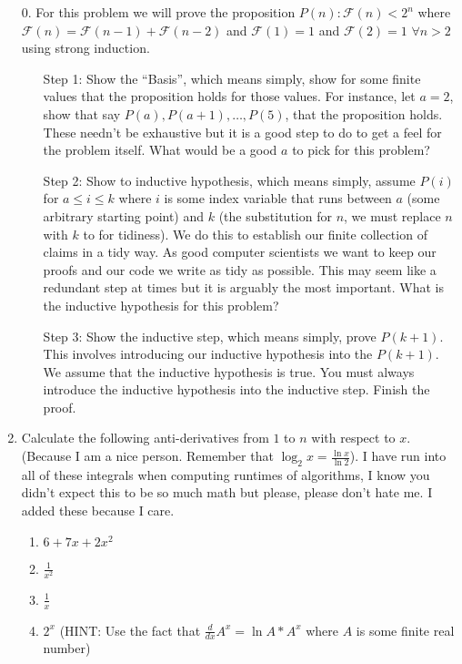 \documentclass[12pt]{article}
\begin{document}
\begin{enumerate}
\item[0.] For this problem we will prove the proposition $P(n):\mathscr{F}(n) < 2^n$ where 
$\mathscr{F}(n) = \mathscr{F}(n-1) + \mathscr{F}(n-2)$ and 
$\mathscr{F}(1)=1$ and $\mathscr{F}(2) = 1$ $\forall n > 2$ 
using strong induction. 
\begin{enumerate}
\item[Step 1:] Show the ``Basis'', which means simply, show for some finite 
values that the proposition holds for those values. For instance, let $a=2$, 
show that say $P(a),P(a+1),\dots, P(5)$, that the proposition holds. These needn't 
be exhaustive but it is a good step to do to get a feel for the problem itself. 
What would be a good $a$ to pick for this problem?
\item[Step 2:] Show to inductive hypothesis, which means simply, assume $P(i)$ 
for $a \le i \le k$ where $i$ is some index variable that runs between $a$ (some 
arbitrary starting point) and $k$ (the substitution for $n$, we must replace $n$
with $k$ to for tidiness). We do this to establish our finite collection of claims 
in a tidy way. As good computer scientists we want to keep our proofs and our code 
we write as tidy as possible. This may seem like a redundant step at times but it is 
arguably the most important. What is the inductive hypothesis for this problem?
\item[Step 3: ] Show the inductive step, which means simply, prove $P(k+1)$. This 
involves introducing our inductive hypothesis into the $P(k+1)$. We assume 
that the inductive hypothesis is true. You must always introduce the inductive hypothesis into 
the inductive step. Finish the proof.
\end{enumerate}
\newpage
\item Calculate the following anti-derivatives from $1$ to $n$ with respect to $x$. 
(Because I am a nice person. Remember that $\log_2{x}=\frac{\ln{x}}{\ln{2}}$). 
I have run into all of these integrals when computing runtimes of algorithms, 
I know you didn't expect this to be so much math but please, please don't hate me. 
I added these because I care.
\begin{enumerate}
\item $6+7x+2x^2$
\item $\frac{1}{x^2}$
\item $\frac{1}{x}$
\item $2^x$ (HINT: Use the fact that $\frac{d}{dx}A^x = \ln{A}*A^x$ where $A$ is some finite real number)

\end{enumerate}
\end{enumerate}
\end{document}
